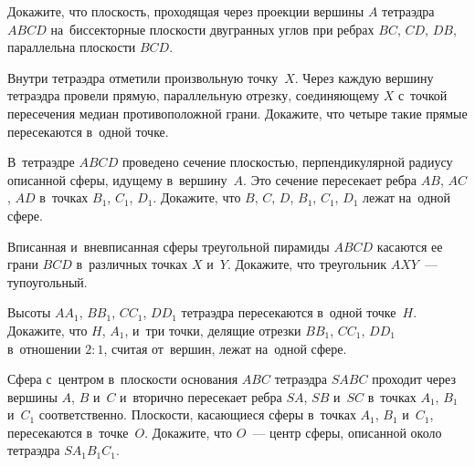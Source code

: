 


\begin{problems}

\item
Докажите, что плоскость, проходящая через проекции вершины $A$ тетраэдра $ABCD$
на~биссекторные плоскости двугранных углов при ребрах $BC$, $CD$, $DB$,
параллельна плоскости $BCD$.

\item
Внутри тетраэдра отметили произвольную точку~$X$.
Через каждую вершину тетраэдра провели прямую, параллельную отрезку,
соединяющему $X$ с~точкой пересечения медиан противоположной грани.
Докажите, что четыре такие прямые пересекаются в~одной точке.

\item
В~тетраэдре $ABCD$ проведено сечение плоскостью, перпендикулярной радиусу
описанной сферы, идущему в~вершину~$A$.
Это сечение пересекает ребра $AB$, $AC$, $AD$ в~точках $B_1$, $C_1$, $D_1$.
Докажите, что $B$, $C$, $D$, $B_1$, $C_1$, $D_1$ лежат на~одной сфере.

\item
Вписанная и~вневписанная сферы треугольной пирамиды $ABCD$ касаются ее грани
$BCD$ в~различных точках $X$ и~$Y$.
Докажите, что треугольник $AXY$~--- тупоугольный.

\item
Высоты $AA_{1}$, $BB_{1}$, $CC_{1}$, $DD_{1}$ тетраэдра пересекаются в~одной
точке~$H$.
Докажите, что $H$, $A_1$, и~три точки, делящие
отрезки $BB_{1}$, $CC_{1}$, $DD_{1}$ в~отношении $2 : 1$, считая от~вершин,
лежат на~одной сфере.

\item
Сфера с~центром в~плоскости основания $ABC$ тетраэдра $SABC$ проходит через
вершины $A$, $B$ и~$C$ и~вторично пересекает ребра $SA$, $SB$ и~$SC$
в~точках $A_1$, $B_1$ и~$C_1$ соответственно.
Плоскости, касающиеся сферы в~точках $A_1$, $B_1$ и~$C_1$, пересекаются
в~точке~$O$.
Докажите, что $O$~--- центр сферы, описанной около тетраэдра
\(SA_{1}B_{1}C_{1}\).


\end{problems}

